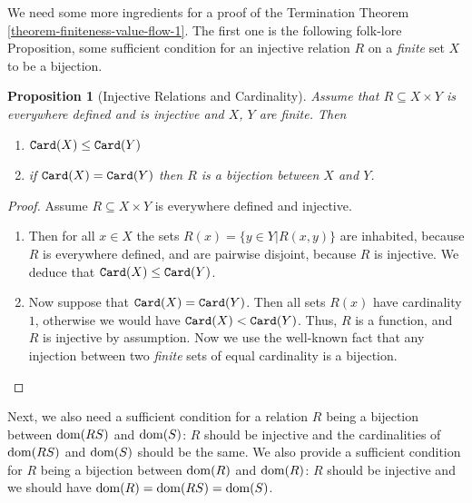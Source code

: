 \documentclass{lmcs}
\newtheorem{proposition}[theorem]{Proposition}
\begin{document}
We need some more ingredients for a proof of the Termination 
Theorem \ref{theorem-finiteness-value-flow-1}. 
The first one is the following folk-lore Proposition, some sufficient condition
for an injective relation $R$ on a \emph{finite} set $X$ to be a bijection.


\begin{proposition}[Injective Relations and Cardinality]
\label{proposition-injective-relation}
Assume that $R \subseteq X \times Y$ is \emph{everywhere defined} 
and is \emph{injective} and $X$, $Y$ are finite. Then 
\begin{enumerate}
\item
\label{proposition-injective-relation-01}
${\tt Card}(X) \le {\tt Card}(Y)$

\item  
\label{proposition-injective-relation-02}
if ${\tt Card}(X)={\tt Card}(Y)$
then $R$ is a bijection between $X$ and $Y$.
\end{enumerate}
\end{proposition}

\begin{proof}
Assume $R \subseteq X \times Y$ is everywhere defined and injective. 
\begin{enumerate}
\item
Then
for all $x \in X$ the sets $R(x) = \{ y \in Y | R(x,y) \}$ are inhabited,
because $R$ is everywhere defined, and are pairwise disjoint,
because $R$ is injective.
We deduce that ${\tt Card}(X) \le {\tt Card}(Y)$.

\item
Now suppose that ${\tt Card}(X) = {\tt Card}(Y)$.
Then all sets $R(x)$ have cardinality $1$, 
otherwise we would have ${\tt Card}(X)<{\tt Card}(Y)$. 
Thus, $R$ is a function, and $R$ is injective by assumption. 
Now we use the well-known fact that any injection
between two \emph{finite} sets of equal cardinality is a bijection.
\end{enumerate}
\end{proof}


Next, we also need a sufficient condition for a relation $R$ being
a bijection between ${\rm dom}(RS)$ and ${\rm dom}(S)$: $R$ should be injective
and the cardinalities of ${\rm dom}(RS)$ and ${\rm dom}(S)$ should be the same.
We also provide a sufficient condition for $R$ being
a bijection between ${\rm dom}(R)$ and ${\rm dom}(R)$:
$R$ should be injective and we should have ${\rm dom}(R)={\rm dom}(RS)={\rm dom}(S)$.
\end{document}
